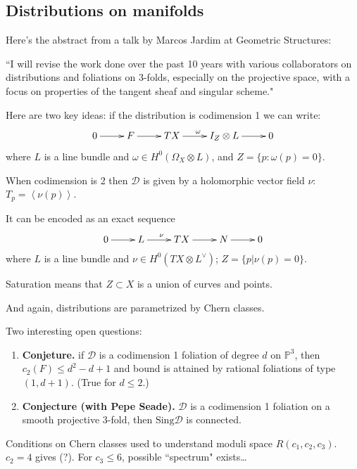 \subsection{Distributions on manifolds}
\label{subsection-distributions-on-manifolds}

Here's the abstract from a talk by Marcos Jardim at Geometric Structures:

``I will revise the work done over the past 10 years with various collaborators
on distributions and foliations on 3-folds, especially on the projective space,
with a focus on properties of the tangent sheaf and singular scheme."

Here are two key ideas: if the distribution is codimension 1 we can write:
$$
\xymatrix{
0\ar[r]&F\ar[r]&TX\ar[r]^{\omega}&I_Z \otimes L\ar[r]&0
}
$$
where $L$ is a line bundle and $\omega \in H^{0}(\Omega_X \otimes L)$, and
$Z=\{p:\omega(p)=0\}$.

When codimension is 2 then $\mathcal{D}$ is given by a holomorphic vector field 
$\nu$: $T_p=\left<\nu(p)\right>$.

It can be encoded as an exact sequence
$$
\xymatrix{
	0\ar[r]&L\ar[r]^{\nu}&TX\ar[r]&N\ar[r]&0
}
$$
where $L$ is a line bundle and $\nu \in H^{0}(TX \otimes L^\vee)$;
  $Z=\{p | \nu(p) = 0\}$.

\begin{remark}
\label{remark-stauration}
Saturation means that $Z \subset X$ is a union of curves and points.
\end{remark}

And again, distributions are parametrized by Chern classes.

Two interesting open questions:
\begin{enumerate}
\item {\bf Conjeture.} if $\mathcal{D}$ is a codimension 1 foliation of degree
$d$ on $\mathbb{P}^3$, then $c_2(F)\leq d^2-d+1$ and bound is attained
by rational foliations of type $(1,d+1)$. (True for $d \leq 2$.)
\item {\bf Conjecture (with Pepe Seade).} $\mathcal{D}$ is a codimension 1 
foliation on a smooth projective 3-fold, then $\text{Sing}\mathcal{D}$ is connected.
\end{enumerate}

\begin{theorem}
\label{theorem-jardim-muniz}
Conditions on Chern classes used to understand moduli space $R(c_1,c_2,c_3)$.
$c_2=4$ gives (?). For $c_3\leq 6$, possible ``spectrum" exists…
\end{theorem}

